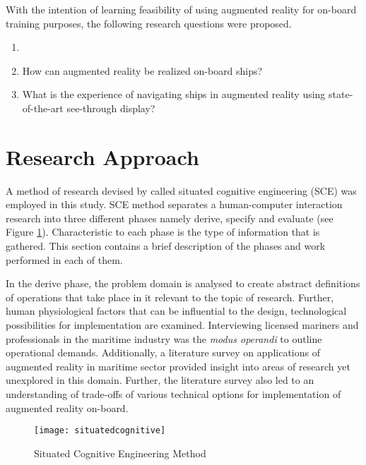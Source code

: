With the intention of learning feasibility of using augmented reality for on-board training purposes, the following research questions were proposed.

\begin{enumerate}
	\item {}
	\item How can augmented reality be realized on-board ships?
	\item What is the experience of navigating ships in augmented reality using state-of-the-art see-through display?
\end{enumerate}

\section{Research Approach}
A method of research devised by \cite{neerincx2008situated} called situated cognitive engineering (SCE) was employed in this study. SCE method separates a human-computer interaction research into three different phases namely derive, specify and evaluate (see Figure \ref{fig:sce}). Characteristic to each phase is the type of information that is gathered. This section contains a brief description of the phases and work performed in each of them. 

In the derive phase, the problem domain is analysed to create abstract definitions of operations that take place in it relevant to the topic of research. Further, human physiological factors that can be influential to the design, technological possibilities for implementation are examined. Interviewing licensed mariners and professionals in the maritime industry was the \textit{modus operandi} to outline operational demands. Additionally, a literature survey on applications of augmented reality in maritime sector provided insight into areas of research yet unexplored in this domain. Further, the literature survey also led to an understanding of trade-offs of various technical options for implementation of augmented reality on-board.

\begin{figure}
	\centering
	\texttt{[image: situatedcognitive]}
	\caption{Situated Cognitive Engineering Method \parencite{neerincx2008situated}}
	\label{fig:sce}
\end{figure}

